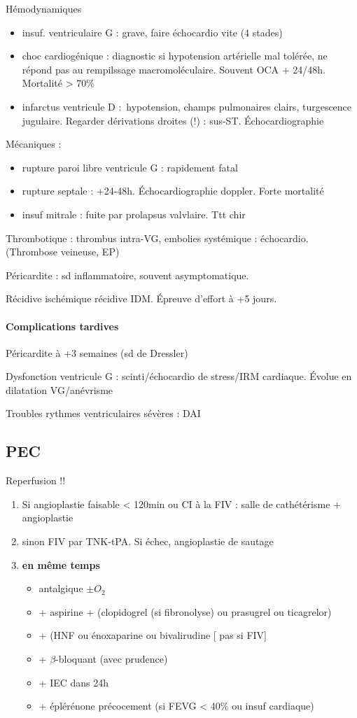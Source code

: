 \documentclass{article}
\begin{document}
Hémodynamiques
\begin{itemize}
  \item insuf. ventriculaire G : grave, faire échocardio vite (4 stades)
  \item choc cardiogénique : diagnostic si hypotension artérielle mal tolérée,
    ne répond pas au rempilssage macromoléculaire. Souvent \gls{OCA} + 24/48h.
    Mortalité > 70\%
  \item infarctus ventricule D : hypotension, champs pulmonaires clairs,
    turgescence jugulaire. Regarder dérivations droites (!) : sus-ST.
    Échocardiographie
\end{itemize}
Mécaniques :
\begin{itemize}
  \item rupture paroi libre ventricule G : rapidement fatal
  \item rupture septale : +24-48h. Échocardiographie doppler. Forte mortalité
  \item insuf mitrale : fuite par prolapsus valvlaire. Ttt chir
\end{itemize}
Thrombotique : thrombus intra-VG, embolies systémique : échocardio. (Thrombose
veineuse, EP)

Péricardite : sd inflammatoire, souvent asymptomatique.

Récidive ischémique \thus récidive IDM. Épreuve d'effort à  +5 jours.

\paragraph{Complications tardives}
Péricardite à +3 semaines (sd de Dressler)

Dysfonction ventricule G : scinti/échocardio de stress/IRM cardiaque. Évolue en
dilatation VG/anévrisme

Troubles rythmes ventriculaires sévères : \gls{DAI}

\subsection{PEC}
Reperfusion !!
\begin{enumerate}
\item Si angioplastie faisable < 120min ou CI à la \gls{FIV} : salle de cathétérisme +
  angioplastie
\item sinon FIV par TNK-tPA. Si échec, angioplastie de sautage
\item \textbf{en même temps } 
  \begin{itemize}
  \item antalgique $\pm O_2$
  \item + aspirine + (clopidogrel (si fibronolyse) ou prasugrel ou ticagrelor)
  \item + (HNF ou énoxaparine ou bivalirudine [\danger{} pas si FIV]
  \item + $\beta$-bloquant (avec prudence)
  \item + IEC dans 24h
  \item + éplérénone précocement (si FEVG < 40\% ou insuf cardiaque)
\end{itemize}
\end{enumerate}
  
\end{document}
